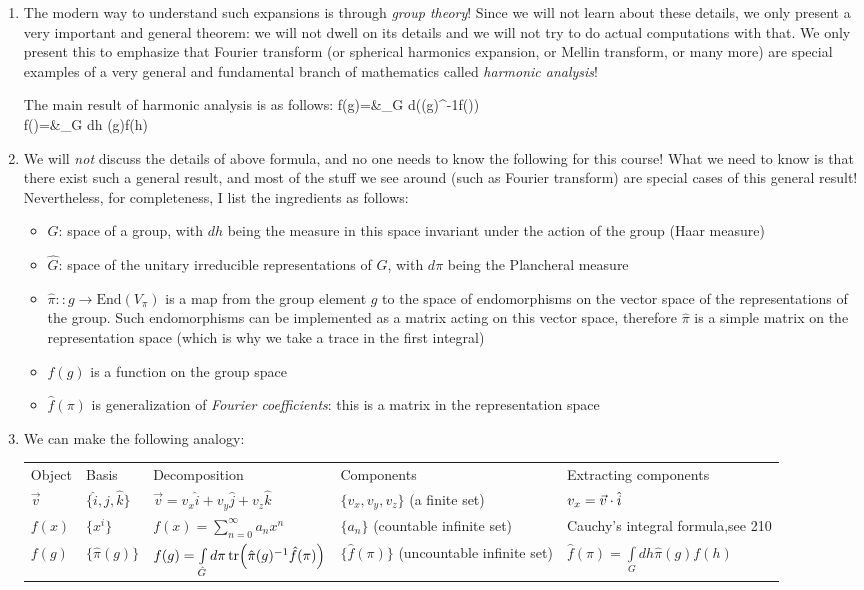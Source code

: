 {\begin{enumerate}
\item The modern way to understand such expansions is through \emph{group theory}! Since we will not learn about these details, we only present a very important and general theorem: we will not dwell on its details and we will not try to do actual computations with that. We only present this to emphasize that Fourier transform (or spherical harmonics expansion, or Mellin transform, or many more) are special examples of a very general and fundamental branch of mathematics called \emph{harmonic analysis}!

The main result of harmonic analysis is as follows:
\bea 
f(g)=&\int\limits_{\hat G} d\pi \tr(\hat\pi(g)^{-1}\hat f(\pi))\\
\hat f(\pi)=&\int\limits_G dh \hat\pi(g)f(h)
\eea 
\item We will \emph{not} discuss the details of above formula, and no one needs to know the following for this course! What we need to know is that there exist such a general result, and most of the stuff we see around (such as Fourier transform) are special cases of this general result! Nevertheless, for completeness, I list the ingredients as follows:
\begin{itemize}
	\item $G$: space of a group, with $dh$ being the measure in this space invariant under the action of the group (Haar measure)
	\item $\hat G$: space of the unitary irreducible representations of $G$, with $d\pi$ being the Plancheral measure
	\item $\hat\pi :: g\to\mathrm{End}(V_\pi)$ is a map from the group element $g$ to the space of endomorphisms on the vector space of the representations of the group. Such endomorphisms can be implemented as a matrix acting on this vector space, therefore $\hat\pi$ is a simple matrix on the representation space (which is why we take a trace in the first integral)
	\item $f(g)$ is a function on the group space
	\item $\hat f(\pi)$ is generalization of \emph{Fourier coefficients}: this is a matrix in the representation space
\end{itemize}
\item We can make the following analogy:\\
\begin{tabular}{lllll}
	Object & Basis & Decomposition & Components& Extracting components\\ 
	$\vec{v}$ & $\{\hat i,\hat j,\hat k\}$ & $\vec{v}=v_x\hat i+v_y\hat j+v_z\hat k$ & $\{v_x,v_y,v_z\}$ (a finite set)& $v_x=\vec{v}\.\hat i$\\ 
	$f(x)$&$\{x^i\}$&$f(x)=\sum\limits_{n=0}^\infty a_n x^n$&$\{a_n\}$ (countable infinite set)& {\footnotesize Cauchy's integral formula,see 210}\\
	$f(g)$ &$\{\hat\pi(g)\}$& $f(g)=\int\limits_{\hat G} d\pi \tr(\hat\pi(g)^{-1}\hat f(\pi))$ & $\{\hat f(\pi)\}$ (uncountable infinite set)&$\hat f(\pi)=\int\limits_G dh \hat\pi(g)f(h)$
\end{tabular}



\end{enumerate}}
